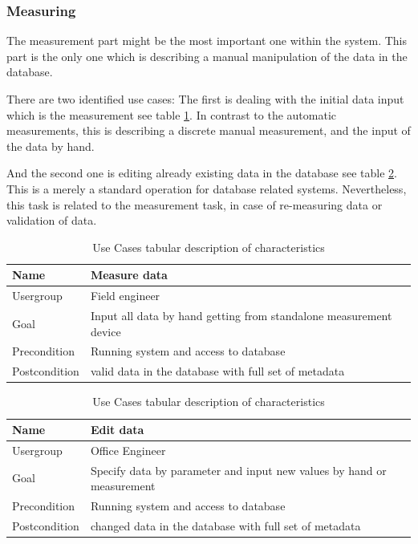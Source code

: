 \subsubsection{Measuring}

The measurement part might be the most important one within the system. This part is the only one which is describing a manual manipulation of the data in the database.

There are two identified use cases: The first is dealing with the initial data input which is the measurement see table \ref{table:use case description of "Measure data"}. In contrast to the automatic measurements, this is describing a discrete manual measurement, and the input of the data by hand.

And the second one is editing already existing data in the database see table \ref{table:use case description of "Edit data"}. This is a merely a standard operation for database related systems. Nevertheless, this task is related to the measurement task, in case of re-measuring data or validation of data.

\begin{table}[H]
\centering
\begin{tabular}{l | p{11cm}}
Name & Measure data\\ \hline 
Usergroup & Field engineer\\ \hline 
Goal & Input all data by hand  getting from standalone measurement device\\ \hline 
Precondition & Running system and access to database\\ \hline 
Postcondition & valid data in the database with full set of metadata\\ 
\end{tabular}
\caption{Use Cases tabular description of characteristics} 
\label{table:use case description of "Measure data"}
\end{table}

\begin{table}[H]
\centering
\begin{tabular}{l | p{11cm}}
Name & Edit data\\ \hline 
Usergroup & Office Engineer\\ \hline 
Goal & Specify data by parameter and input new values by hand or measurement\\ \hline 
Precondition & Running system and access to database\\ \hline 
Postcondition & changed data in the database with full set of metadata\\ 
\end{tabular}
\caption{Use Cases tabular description of characteristics} 
\label{table:use case description of "Edit data"}
\end{table}

